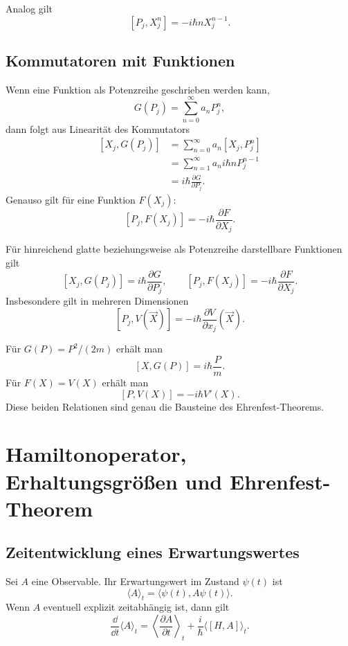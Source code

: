 Analog gilt
\[
    [P_j,X_j^n]=-i\hbar nX_j^{n-1}.
\]

\subsection{Kommutatoren mit Funktionen}

Wenn eine Funktion als Potenzreihe geschrieben werden kann,
\[
    G(P_j)=\sum_{n=0}^{\infty}a_nP_j^n,
\]
dann folgt aus Linearität des Kommutators
\[
\begin{aligned}
    [X_j,G(P_j)]
    &=\sum_{n=0}^{\infty}a_n[X_j,P_j^n] \\
    &=\sum_{n=1}^{\infty}a_n i\hbar nP_j^{n-1} \\
    &=i\hbar\frac{\partial G}{\partial P_j}.
\end{aligned}
\]
Genauso gilt für eine Funktion $F(X_j)$:
\[
    [P_j,F(X_j)]=-i\hbar\frac{\partial F}{\partial X_j}.
\]

\begin{formulabox}
Für hinreichend glatte beziehungsweise als Potenzreihe darstellbare Funktionen gilt
\[
    [X_j,G(P_j)]=i\hbar\frac{\partial G}{\partial P_j},
    \qquad
    [P_j,F(X_j)]=-i\hbar\frac{\partial F}{\partial X_j}.
\]
Insbesondere gilt in mehreren Dimensionen
\[
    [P_j,V(\vec X)]=-i\hbar\frac{\partial V}{\partial x_j}(\vec X).
\]
\end{formulabox}

\begin{examplebox}
Für $G(P)=P^2/(2m)$ erhält man
\[
    [X,G(P)]=i\hbar\frac{P}{m}.
\]
Für $F(X)=V(X)$ erhält man
\[
    [P,V(X)]=-i\hbar V'(X).
\]
Diese beiden Relationen sind genau die Bausteine des Ehrenfest-Theorems.
\end{examplebox}

\section{Hamiltonoperator, Erhaltungsgrößen und Ehrenfest-Theorem}

\subsection{Zeitentwicklung eines Erwartungswertes}

Sei $A$ eine Observable. Ihr Erwartungswert im Zustand $\psi(t)$ ist
\[
    \langle A\rangle_t=\langle\psi(t),A\psi(t)\rangle.
\]
Wenn $A$ eventuell explizit zeitabhängig ist, dann gilt
\[
    \frac{\dd}{\dd t}\langle A\rangle_t
    =\left\langle\frac{\partial A}{\partial t}\right\rangle_t
    +\frac{i}{\hbar}\langle[H,A]\rangle_t.
\]

